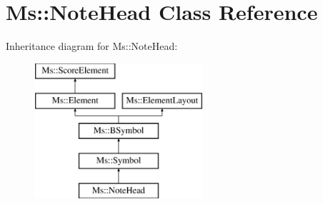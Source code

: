 \hypertarget{class_ms_1_1_note_head}{}\section{Ms\+:\+:Note\+Head Class Reference}
\label{class_ms_1_1_note_head}
Inheritance diagram for Ms\+:\+:Note\+Head\+:\begin{figure}[H]
\begin{center}
\leavevmode
\includegraphics[height=5.000000cm]{class_ms_1_1_note_head}
\end{center}
\end{figure}
